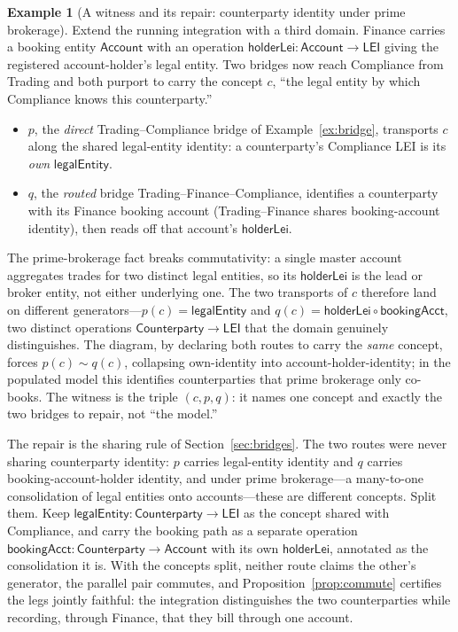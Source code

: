 \documentclass[11pt]{article}
\theoremstyle{plain}
\theoremstyle{definition}
\newtheorem{example}{Example}
\newcommand{\Cpty}{\mathsf{Counterparty}}
\begin{document}
\begin{example}[A witness and its repair: counterparty identity under prime brokerage]\label{ex:witness}
Extend the running integration with a third domain. \textsf{Finance} carries a booking entity $\mathsf{Account}$ with an operation $\mathsf{holderLei}\colon\mathsf{Account}\to\mathsf{LEI}$ giving the registered account-holder's legal entity. Two bridges now reach Compliance from Trading and both purport to carry the concept $c$, ``the legal entity by which Compliance knows this counterparty.''
\begin{itemize}[leftmargin=1.4em,itemsep=0.1em]
  \item $p$, the \emph{direct} Trading--Compliance bridge of Example~\ref{ex:bridge}, transports $c$ along the shared legal-entity identity: a counterparty's Compliance LEI is its \emph{own} $\mathsf{legalEntity}$.
  \item $q$, the \emph{routed} bridge Trading--Finance--Compliance, identifies a counterparty with its Finance booking account (Trading--Finance shares booking-account identity), then reads off that account's $\mathsf{holderLei}$.
\end{itemize}
The prime-brokerage fact breaks commutativity: a single master account aggregates trades for two distinct legal entities, so its $\mathsf{holderLei}$ is the lead or broker entity, not either underlying one. The two transports of $c$ therefore land on different generators---$p(c)=\mathsf{legalEntity}$ and $q(c)=\mathsf{holderLei}\circ\mathsf{bookingAcct}$, two distinct operations $\Cpty\to\mathsf{LEI}$ that the domain genuinely distinguishes. The diagram, by declaring both routes to carry the \emph{same} concept, forces $p(c)\sim q(c)$, collapsing own-identity into account-holder-identity; in the populated model this identifies counterparties that prime brokerage only co-books. The witness is the triple $(c,p,q)$: it names one concept and exactly the two bridges to repair, not ``the model.''

The repair is the sharing rule of Section~\ref{sec:bridges}. The two routes were never sharing counterparty identity: $p$ carries legal-entity identity and $q$ carries booking-account-holder identity, and under prime brokerage---a many-to-one consolidation of legal entities onto accounts---these are different concepts. Split them. Keep $\mathsf{legalEntity}\colon\Cpty\to\mathsf{LEI}$ as the concept shared with Compliance, and carry the booking path as a separate operation $\mathsf{bookingAcct}\colon\Cpty\to\mathsf{Account}$ with its own $\mathsf{holderLei}$, annotated as the consolidation it is. With the concepts split, neither route claims the other's generator, the parallel pair commutes, and Proposition~\ref{prop:commute} certifies the legs jointly faithful: the integration distinguishes the two counterparties while recording, through Finance, that they bill through one account.
\end{example}
\end{document}
